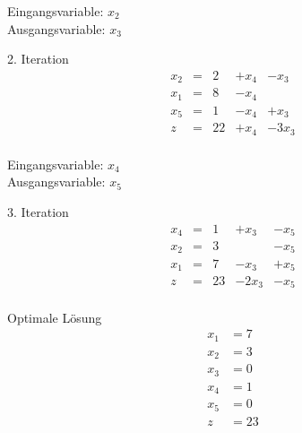 \documentclass[a4paper]{scrartcl}
\begin{document}
\begin{enumerate}
\begin{enumerate}
\begin{enumerate}[(i)]
\begin{enumerate}
                                Eingangsvariable: $x_2$ \\
                                Ausgangsvariable: $x_3$

                                2. Iteration
                                \begin{equation}
                                    \begin{array}{rcrrr}
                                        x_2 & = & 2 & +x_4 & -x_3 \\
                                        x_1 & = & 8 & -x_4 &  \\
                                        x_5 & = & 1 & -x_4 & +x_3 \\
                                        \hline
                                        z   & = & 22 & +x_4 & -3x_3 \\
                                    \end{array}
                                \end{equation}

                                Eingangsvariable: $x_4$ \\
                                Ausgangsvariable: $x_5$

                                3. Iteration
                                \begin{equation}
                                    \begin{array}{rcrrr}
                                        x_4 & = & 1 & +x_3 & -x_5 \\
                                        x_2 & = & 3 &  & -x_5 \\
                                        x_1 & = & 7 & -x_3 & +x_5 \\
                                        \hline
                                        z   & = & 23 & -2x_3 & -x_5 \\
                                    \end{array}
                                \end{equation}

                                Optimale Lösung
                                \begin{align*}
                                    x_1 &= 7 \\
                                    x_2 &= 3 \\
                                    x_3 &= 0 \\
                                    x_4 &= 1 \\
                                    x_5 &= 0 \\
                                    z   &= 23
                                \end{align*}


\end{enumerate}
\end{enumerate}
\end{enumerate}
\end{enumerate}
\end{document}
